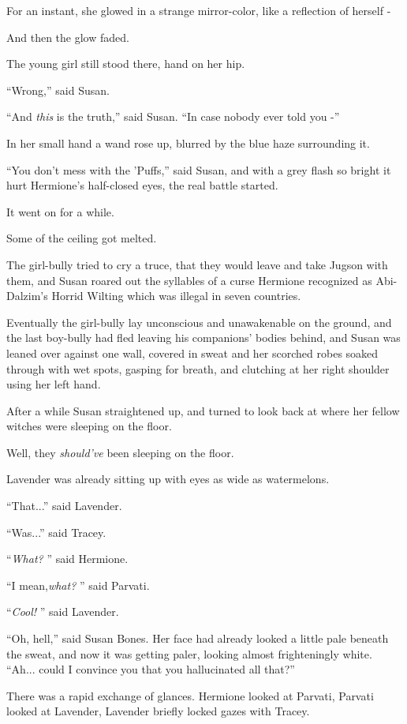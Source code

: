 For an instant, she glowed in a strange mirror-color, like a reflection
of herself -

And then the glow faded.

The young girl still stood there, hand on her hip.

``Wrong,'' said Susan.

``And \emph{this} is the truth,'' said Susan. ``In case nobody ever told
you -''

In her small hand a wand rose up, blurred by the blue haze surrounding
it.

``You don't mess with the 'Puffs,'' said Susan, and with a grey flash so
bright it hurt Hermione's half-closed eyes, the real battle started.

It went on for a while.

Some of the ceiling got melted.

The girl-bully tried to cry a truce, that they would leave and take
Jugson with them, and Susan roared out the syllables of a curse Hermione
recognized as Abi-Dalzim's Horrid Wilting which was illegal in seven
countries.

Eventually the girl-bully lay unconscious and unawakenable on the
ground, and the last boy-bully had fled leaving his companions' bodies
behind, and Susan was leaned over against one wall, covered in sweat and
her scorched robes soaked through with wet spots, gasping for breath,
and clutching at her right shoulder using her left hand.

After a while Susan straightened up, and turned to look back at where
her fellow witches were sleeping on the floor.

Well, they \emph{should've} been sleeping on the floor.

Lavender was already sitting up with eyes as wide as watermelons.

``That...'' said Lavender.

``Was...'' said Tracey.

``\emph{What?} '' said Hermione.

``I mean,\emph{what?} '' said Parvati.

``\emph{Cool!} '' said Lavender.

``Oh, hell,'' said Susan Bones. Her face had already looked a little
pale beneath the sweat, and now it was getting paler, looking almost
frighteningly white. ``Ah... could I convince you that you
hallucinated all that?''

There was a rapid exchange of glances. Hermione looked at Parvati,
Parvati looked at Lavender, Lavender briefly locked gazes with Tracey.

